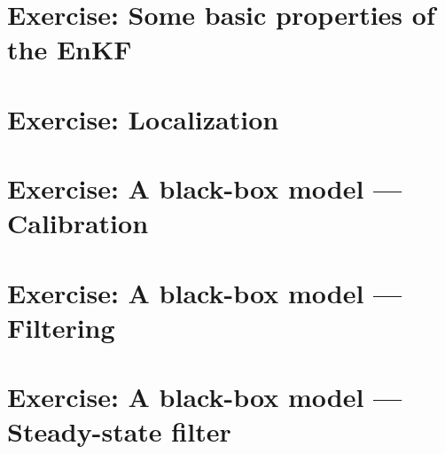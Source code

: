 \documentclass[a4paper,10pt]{article}
\begin{document}
\section{Exercise: Some basic properties of the EnKF}


%


\section{Exercise: Localization}


\section{Exercise:  A black-box model --- Calibration}
\newcommand{\opgave}{exercise\_black\_box\_calibration\_polution}




\section{Exercise: A black-box model --- Filtering}
\renewcommand{\opgave}{exercise\_black\_box\_enkf\_polution}


\section{Exercise: A black-box model --- Steady-state filter}


%
\end{document}

